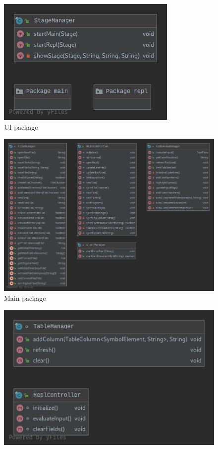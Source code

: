 \documentclass[
]{report}
\begin{document}
\begin{appendices}
\begin{figure}
	\end{figure}
	\begin{figure}
		\centering
		\includegraphics[width=\textwidth]{ui-package-diagram}
		\caption{UI package}
		\label{fig:ui-package-diagram}
	\end{figure}
	\begin{figure}
		\centering
		\includegraphics[width=\textwidth]{main-package-diagram}
		\caption{Main package}
		\label{fig:main-package-diagram}
	\end{figure}
	\begin{figure}
		\centering
		\includegraphics[width=\textwidth]{repl-package-diagram}

\end{figure}
\end{appendices}
\end{document}
